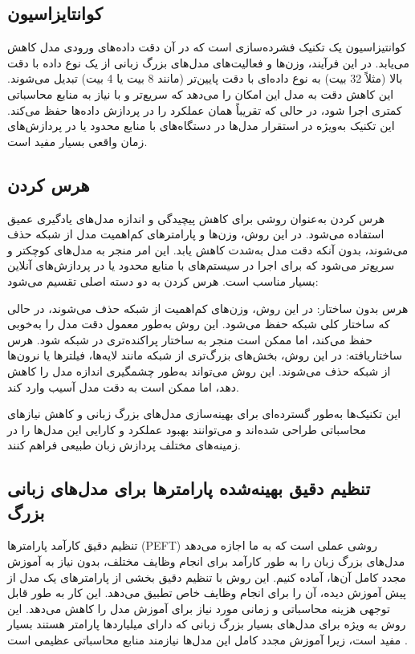  \subsection{کوانتایزاسیون}
 
 کوانتیزاسیون یک تکنیک فشرده‌سازی است که در آن دقت داده‌های ورودی مدل کاهش می‌یابد. در این فرآیند، وزن‌ها و فعالیت‌های مدل‌های بزرگ زبانی از یک نوع داده با دقت بالا (مثلاً 32 بیت) به نوع داده‌ای با دقت پایین‌تر (مانند 8 بیت یا 4 بیت) تبدیل می‌شوند. این کاهش دقت به مدل این امکان را می‌دهد که سریع‌تر و با نیاز به منابع محاسباتی کمتری اجرا شود، در حالی که تقریباً همان عملکرد را در پردازش داده‌ها حفظ می‌کند. این تکنیک به‌ویژه در استقرار مدل‌ها در دستگاه‌های با منابع محدود یا در پردازش‌های زمان واقعی بسیار مفید است.
\subsection{ هرس کردن}
 
 هرس کردن به‌عنوان روشی برای کاهش پیچیدگی و اندازه مدل‌های یادگیری عمیق استفاده می‌شود. در این روش، وزن‌ها و پارامترهای کم‌اهمیت مدل از شبکه حذف می‌شوند، بدون آنکه دقت مدل به‌شدت کاهش یابد. این امر منجر به مدل‌های کوچکتر و سریع‌تر می‌شود که برای اجرا در سیستم‌های با منابع محدود یا در پردازش‌های آنلاین بسیار مناسب است. هرس کردن به دو دسته اصلی تقسیم می‌شود:
 
 هرس بدون ساختار: در این روش، وزن‌های کم‌اهمیت از شبکه حذف می‌شوند، در حالی که ساختار کلی شبکه حفظ می‌شود. این روش به‌طور معمول دقت مدل را به‌خوبی حفظ می‌کند، اما ممکن است منجر به ساختار پراکنده‌تری در شبکه شود.
 هرس ساختاریافته: در این روش، بخش‌های بزرگ‌تری از شبکه مانند لایه‌ها، فیلترها یا نرون‌ها از شبکه حذف می‌شوند. این روش می‌تواند به‌طور چشمگیری اندازه مدل را کاهش دهد، اما ممکن است به دقت مدل آسیب وارد کند.
 
 این تکنیک‌ها به‌طور گسترده‌ای برای بهینه‌سازی مدل‌های بزرگ زبانی و کاهش نیازهای محاسباتی طراحی شده‌اند و می‌توانند بهبود عملکرد و کارایی این مدل‌ها را در زمینه‌های مختلف پردازش زبان طبیعی فراهم کنند.
 
 
 
 

\subsection{ تنظیم دقیق بهینه‌شده پارامترها برای مدل‌های زبانی بزرگ}
تنظیم دقیق کارآمد پارامترها (PEFT) روشی عملی است که به ما اجازه می‌دهد مدل‌های بزرگ زبان را به طور کارآمد برای انجام وظایف مختلف، بدون نیاز به آموزش مجدد کامل آن‌ها، آماده کنیم. این روش با تنظیم دقیق بخشی از پارامترهای یک مدل از پیش آموزش دیده، آن را برای انجام وظایف خاص تطبیق می‌دهد. این کار به طور قابل توجهی هزینه محاسباتی و زمانی مورد نیاز برای آموزش مدل را کاهش می‌دهد. این روش به ویژه برای مدل‌های بسیار بزرگ زبانی که دارای میلیاردها پارامتر هستند بسیار مفید است، زیرا آموزش مجدد کامل این مدل‌ها نیازمند منابع محاسباتی عظیمی است
\cite{Han2024ParameterEfficientFF}.

